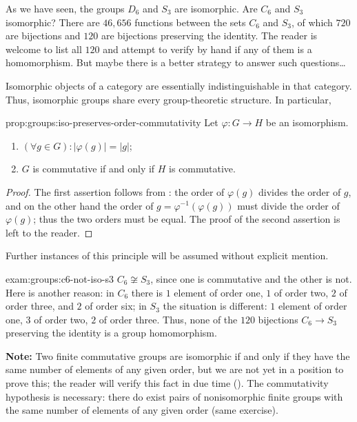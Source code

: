 As we have seen, the groups $D_6$ and $S_3$ are isomorphic. Are $C_6$
and $S_3$ isomorphic? There are $46{,}656$ functions between the sets
$C_6$ and $S_3$, of which $720$ are bijections and $120$ are
bijections preserving the identity. The reader is welcome to list all
$120$ and attempt to verify by hand if any of them is a
homomorphism. But maybe there is a better strategy to answer such
questions\ldots

Isomorphic objects of a category are essentially indistinguishable in
that category. Thus, isomorphic groups share every group-theoretic
structure. In particular,
\begin{prop}{}{prop:groups:iso-preserves-order-commutativity}
  Let $\varphi : G \to H$ be an isomorphism.
\begin{enumerate}[label=(\roman*)]
  \item $(\forall g \in G) : |\varphi(g)| = |g|$;
  \item $G$ is commutative if and only if $H$ is commutative.
  \end{enumerate}
\end{prop}
\begin{proof}
  The first assertion follows from
  : the order of $\varphi(g)$
  divides the order of $g$, and on the other hand the order of
  $g = \varphi^{-1}(\varphi(g))$ must divide the order of
  $\varphi(g)$; thus the two orders must be equal. The proof of the
  second assertion is left to the reader.
\end{proof}
Further instances of this principle will be assumed without explicit
mention.

\begin{exam}{}{exam:groups:c6-not-iso-s3}
  $C_6 \not\cong S_3$, since one is commutative and the other is
  not. Here is another reason: in $C_6$ there is $1$ element of order
  one, $1$ of order two, $2$ of order three, and $2$ of order six; in
  $S_3$ the situation is different: $1$ element of order one, $3$ of
  order two, $2$ of order three. Thus, none of the $120$ bijections
  $C_6 \to S_3$ preserving the identity is a group homomorphism.

  \textbf{Note:} Two finite commutative groups are isomorphic if and
  only if they have the same number of elements of any given order,
  but we are not yet in a position to prove this; the reader will
  verify this fact in due time
  (). The
  commutativity hypothesis is necessary: there do exist pairs of
  nonisomorphic finite groups with the same number of elements of any
  given order (same exercise).
\end{exam}

